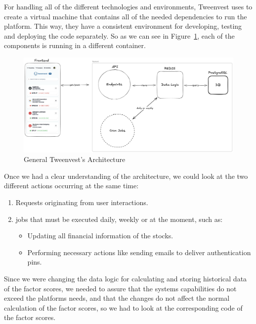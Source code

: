 \documentclass[11pt,english,a4paper,hidelinks]{book}
\begin{document}
\vspace{0.5cm}
\noindent For handling all of the different technologies and environments, Tweenvest uses \textbf{\textcite{dockercompose2025}} to create a virtual machine that contains all of the needed dependencies to run the platform. This way, they have a consistent environment for developing, testing and deploying the code separately. So as we can see in Figure~\ref{fig:general_architecture}, each of the components is running in a different container.

\begin{figure}[H]
    \centering
    \includegraphics[width=1\textwidth]{images/tweenvest/general architecture.png}
    \caption{General Tweenvest's Architecture}
    \label{fig:general_architecture}
\end{figure}

\noindent Once we had a clear understanding of the architecture, we could look at the two different actions occurring at the same time: 
\begin{enumerate}
    \item Requests originating from user interactions.
    \item \acrshort{job}s that must be executed daily, weekly or at the moment, such as:
    \begin{itemize}
        \item Updating all financial information of the stocks.
        \item Performing necessary actions like sending emails to deliver authentication pins.
    \end{itemize}
\end{enumerate}

\noindent Since we were changing the data logic for calculating and storing historical data of the factor scores, we needed to assure that the systems capabilities do not exceed the platforms needs, and that the changes do not affect the normal calculation of the factor scores, so we had to look at the corresponding code of the factor scores.
\end{document}
